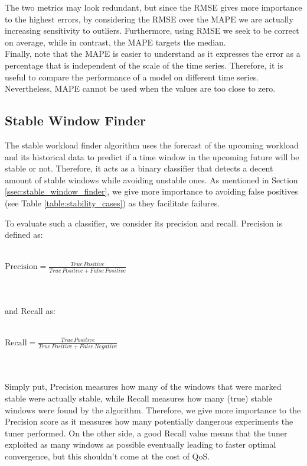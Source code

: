 \documentclass[a4paper, 12pt]{article} %
\begin{document}
	The two metrics may look redundant, but since the RMSE gives more importance to the highest errors, by considering the RMSE over the MAPE we are actually increasing sensitivity to outliers. Furthermore, using RMSE we seek to be correct on average, while in contrast, the MAPE targets the median.\\
	Finally, note that the MAPE is easier to understand as it expresses the error as a percentage that is independent of the scale of the time series. Therefore, it is useful to compare the performance of a model on different time series. Nevertheless, MAPE cannot be used when the values are too close to zero.
	
	\subsection{Stable Window Finder } \label{ssec:exp_stable_wkld_finder}
	The stable workload finder algorithm uses the forecast of the upcoming workload and its historical data to predict if a time window in the upcoming future will be stable or not. Therefore, it acts as a binary classifier that detects a decent amount of stable windows while avoiding unstable ones. As mentioned in Section \ref{ssec:stable_window_finder}, we give more importance to avoiding false positives (see Table \ref{table:stability_cases}) as they facilitate failures.
	
	To evaluate such a classifier, we consider its precision and recall. Precision is defined as:\\\\
	\centerline{
		$
		\text{Precision} = \frac{ True \, Positive}{ True \, Positive + False \, Positive}
		$
	}\\\\
	and Recall as:\\\\
	\centerline{
		$
		\text{Recall} = \frac{ True \, Positive}{ True \, Positive + False \, Negative}
		$
	}\\\\
	Simply put, Precision measures how many of the windows that were marked stable were actually stable, while Recall measures how many (true) stable windows were found by the algorithm. Therefore, we give more importance to the Precision score as it measures how many potentially dangerous experiments the tuner performed. On the other side, a good Recall value means that the tuner exploited as many windows as possible eventually leading to faster optimal convergence, but this shouldn't come at the cost of QoS.
	
\end{document}
